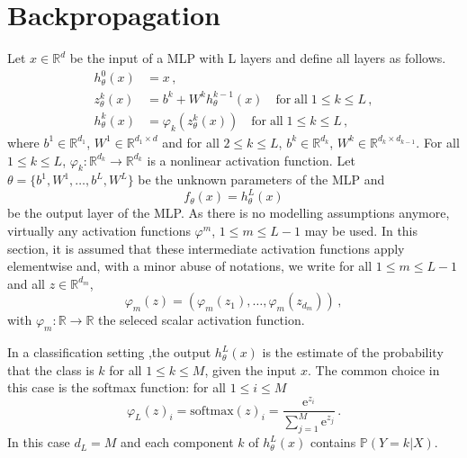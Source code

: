 \documentclass[a4paper,10pt,fleqn]{article}
\newcommand{\eqsp}{\,}
\newcommand{\rset}{\ensuremath{\mathbb{R}}}
\newcommand{\rme}{\ensuremath{\mathrm{e}}}
\newcommand{\1}{\ensuremath{\mathbbm{1}}}
\begin{document}
\section*{Backpropagation}
Let $x\in\rset^d$ be the input of a MLP with L layers and define all layers as follows.
\begin{align*}
h_{\theta}^0(x) &= x\eqsp,\\
z_{\theta}^k(x)  &= b^k + W^kh_{\theta}^{k-1}(x)\quad \mathrm{for\;all\;} 1\leqslant k\leqslant L\eqsp,\\
h_{\theta}^k(x)  &= \varphi_k(z_{\theta}^{k}(x))\quad \mathrm{for\;all\;}1\leqslant k\leqslant L\eqsp,
\end{align*}
where $b^1\in\rset^{d_1}$, $W^1\in\rset^{d_1\times d}$ and for all $2\leqslant k\leqslant L$, $b^k\in\rset^{d_k}$, $W^k\in\rset^{d_k\times d_{k-1}}$. For all $1\leqslant k\leqslant L$, $\varphi_k: \rset^{d_k} \to \rset^{d_k}$ is a nonlinear activation function. Let $\theta = \{b^1,W^1,\ldots,b^L,W^L\}$ be the unknown parameters of the MLP and 
$$
f_{\theta}(x) = h_{\theta}^L(x)
$$
 be the output layer of the MLP. As there is no modelling assumptions anymore, virtually any activation functions $\varphi^m$, $1\leqslant m\leqslant L-1$ may be used. In this section, it is assumed that these intermediate activation functions apply elementwise and, with a minor abuse of notations, we write for all $1\leqslant m\leqslant L-1$ and all $z\in\rset^{d_m}$,
$$
\varphi_m(z) = (\varphi_m(z_1),\ldots, \varphi_m(z_{d_m}))\eqsp,
$$
with $\varphi_m: \rset\to \rset$ the seleced scalar activation function. 

In a classification setting ,the output $h_{\theta}^L(x)$ is the estimate of the probability that the class is  $k$ for all $1\leqslant k\leqslant M$, given the input $x$. The common choice in this case is the softmax function: for all $1\leqslant i\leqslant M$
$$
\varphi_L(z)_i = \mathrm{softmax}(z)_i = \frac{\rme^{z_i}}{\sum_{j=1}^M\rme^{z_j}}\eqsp.
$$
In this case $d_L = M$ and each component $k$ of $h_{\theta}^L(x)$ contains $\mathbb{P}(Y=k | X)$.
\end{document}
